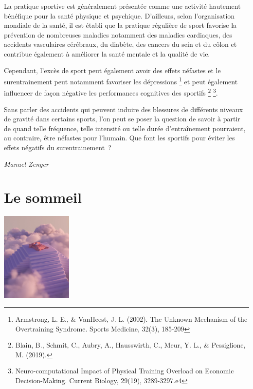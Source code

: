 \documentclass[
  10pt,
  french,
  a5paper,
  openany]{book}
\newenvironment{signature}{\begin{flushright}}{\end{flushright}}
\begin{document}
La pratique sportive est généralement présentée comme une activité hautement bénéfique pour la santé physique et psychique. D'ailleurs, selon l'organisation mondiale de la santé, il est établi que la pratique régulière de sport favorise la prévention de nombreuses maladies notamment des maladies cardiaques, des accidents vasculaires cérébraux, du diabète, des cancers du sein et du côlon et contribue également à améliorer la santé mentale et la qualité de vie.

Cependant, l'excès de sport peut également avoir des effets néfastes et le surentrainement peut notamment favoriser les dépressions \footnote{Armstrong, L. E., \& VanHeest, J. L. (2002). The Unknown Mechanism of the Overtraining Syndrome. Sports Medicine, 32(3), 185-209} et peut également influencer de façon négative les performances cognitives des sportifs \footnote{Blain, B., Schmit, C., Aubry, A., Hausswirth, C., Meur, Y. L., \& Pessiglione, M. (2019).} \footnote{Neuro-computational Impact of Physical Training Overload on Economic Decision-Making. Current Biology, 29(19), 3289-3297.e4}.

Sans parler des accidents qui peuvent induire des blessures de différents niveaux de gravité dans certains sports, l'on peut se poser la question de savoir à partir de quand telle fréquence, telle intensité ou telle durée d'entraînement pourraient, au contraire, être néfastes pour l'humain. Que font les sportifs pour éviter les effets négatifs du surentrainement~?

\begin{signature}
\emph{Manuel Zenger}

\end{signature}

\hypertarget{le-sommeil}{%
\chapter{Le sommeil}\label{le-sommeil}}

\begin{center}
\includegraphics[width=\textwidth,height=12em]{images/sommeil.jpg}

\end{center}
\end{document}
